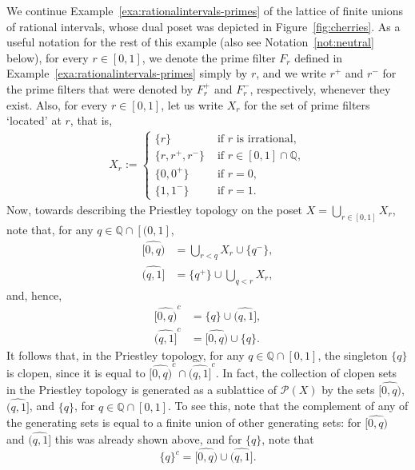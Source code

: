\begin{example}\label{exa:rationalintervals-topology}
We continue Example~\ref{exa:rationalintervals-primes} of the lattice of finite unions of rational intervals, whose dual poset was depicted in Figure~\ref{fig:cherries}. As a useful notation for the rest of this example (also see Notation~\ref{not:neutral} below), for every $r \in [0,1]$, we denote the prime filter $F_r$ defined in Example~\ref{exa:rationalintervals-primes} simply by $r$, and we write $r^+$ and $r^-$ for the prime filters that were denoted by $F_r^+$ and $F_r^-$, respectively, whenever they exist. Also, for every $r \in [0,1]$, let us write $X_r$ for the set of prime filters `located' at $r$, that is,
\begin{align*}
  X_r := \left\{ \begin{array}{ll}
    \{r\} &\text{ if $r$ is irrational,} \\
    \{r, r^+, r^-\} &\text{ if } r \in [0,1] \cap \mathbb{Q}, \\
    \{0, 0^+\} &\text{ if } r = 0, \\
    \{1, 1^-\} &\text{ if } r = 1.
  \end{array} \right.
\end{align*}
Now, towards describing the Priestley topology on the poset $X = \bigcup_{r \in [0,1]} X_r$, note that, for any $q \in \mathbb{Q} \cap [(0,1]$,
\begin{align*}
  \widehat{[0,q)} &= \bigcup_{r < q} X_r \cup \{ q^- \},\\
  \widehat{(q,1]} &= \{q^+\} \cup \bigcup_{q < r} X_r,
\end{align*}
and, hence,
\begin{align*}
  \widehat{[0,q)}^c &= \{q\} \cup \widehat{(q,1]},\\
  \widehat{(q,1]}^c &= \widehat{[0,q)} \cup \{q\}.
\end{align*}
It follows that, in the Priestley topology, for any $q \in \mathbb{Q} \cap [0,1]$, the singleton $\{q\}$ is clopen, since it is equal to $\widehat{[0,q)}^c \cap \widehat{(q,1]}^c$. In fact, the collection of clopen sets in the Priestley topology is generated as a sublattice of $\mathcal{P}(X)$ by the sets $\widehat{[0,q)}$, $\widehat{(q,1]}$, and $\{q\}$, for $q \in \mathbb{Q} \cap [0,1]$. To see this, note that the complement of any of the generating sets is equal to a finite union of other generating sets: for $\widehat{[0,q)}$ and $\widehat{(q,1]}$ this was already shown above, and for $\{q\}$, note that
\[ \{q\}^c = \widehat{[0,q)} \cup \widehat{(q,1]}.\]

\end{example}
